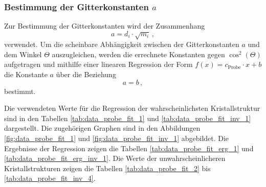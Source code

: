 \clearpage
\subsubsection{Bestimmung der Gitterkonstanten $a$} %
\label{sub:bestimmung_der_gitterkonstanten_probe}

Zur Bestimmung der Gitterkonstanten wird der Zusammenhang
\begin{equation*}
    a = d_i \cdot \sqrt{m_i}\,,
\end{equation*}
verwendet.
Um die scheinbare Abhängigkeit zwischen der Gitterkonstanten $a$ und dem Winkel $\Theta$ auszugleichen,
werden die errechnete Konstanten gegen $\cos^2{(\Theta)}$ aufgetragen und mithilfe einer linearen Regression der Form
$f(x) = c_\text{Probe} \cdot x + b$ die Konstante $a$ über die Beziehung
\begin{equation*}
    a = b\,,
\end{equation*}
bestimmt.

Die verwendeten Werte für die Regression der wahrscheinlichsten Kristallstruktur sind in den Tabellen \ref{tab:data_probe_fit_1} und \ref{tab:data_probe_fit_inv_1} dargestellt.
Die zugehörigen Graphen sind in den Abbildungen \ref{fig:data_probe_fit_1} und \ref{fig:data_probe_fit_inv_1} abgebildet.
Die Ergebnisse der Regression zeigen die Tabellen \ref{tab:data_probe_fit_erg_1} und \ref{tab:data_probe_fit_erg_inv_1}.
Die Werte der unwahrscheinlicheren Kristallstrukturen zeigen die Tabellen \ref{tab:data_probe_fit_2} bis \ref{tab:data_probe_fit_inv_4}.

